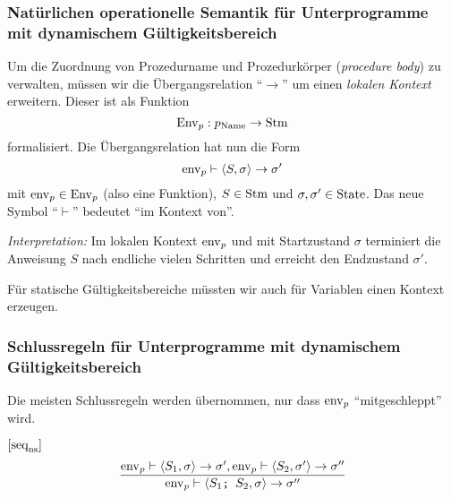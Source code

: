 \begin{lemma}[Determiniertheit]
\subsubsection{Natürlichen operationelle Semantik für Unterprogramme mit dynamischem Gültigkeitsbereich}

Um die Zuordnung von Prozedurname und Prozedurkörper (\emph{procedure body}) zu verwalten, müssen wir die Übergangsrelation ``$\to$'' um einen \emph{lokalen Kontext} erweitern. Dieser ist als Funktion \[
\operatorname{Env}_p: p_{\text{Name}} \to \operatorname{Stm}
\] formalisiert. Die Übergangsrelation hat nun die Form \[
    \operatorname{env}_p \vdash \langle S, \sigma \rangle \to \sigma'
\] mit $\operatorname{env}_p \in \operatorname{Env}_p$ (also eine Funktion), $S \in \operatorname{Stm}$ und $\sigma, \sigma' \in \operatorname{State}$. Das neue Symbol ``$\vdash$'' bedeutet ``im Kontext von''.

\emph{Interpretation:} Im lokalen Kontext $\operatorname{env}_p$ und mit Startzustand $\sigma$ terminiert die Anweisung $S$ nach endliche vielen Schritten und erreicht den Endzustand $\sigma'$.

\par\medskip
\begin{remark}
    Für statische Gültigkeitsbereiche müssten wir auch für Variablen einen Kontext erzeugen.
\end{remark}




\subsubsection{Schlussregeln für Unterprogramme mit dynamischem Gültigkeitsbereich}

Die meisten Schlussregeln werden übernommen, nur dass $\operatorname{env}_p$ ``mitgeschleppt'' wird.

\begin{example}
    $[\text{seq}_{\text{ns}}^{}]$ \begin{align*}
        \frac{
        \operatorname{env}_p \vdash \langle S_1, \sigma \rangle \to \sigma', \operatorname{env}_p \vdash \langle S_2, \sigma' \rangle \to \sigma''
        }{
            \operatorname{env}_p \vdash \langle \texttt{$S_1$; $S_2$}, \sigma \rangle \to \sigma''
        }
    \end{align*}
\end{example}


\end{lemma}
